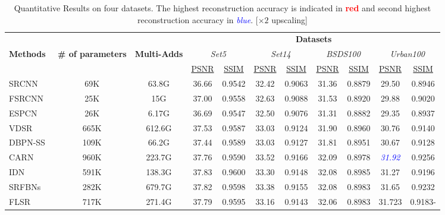 \documentclass[a4paper,11pt]{article}
\begin{document}
\begin{table}[!ht]
\caption{Quantitative Results on four datasets. The highest reconstruction accuracy is indicated in \textbf{\textcolor{red}{red}} and second highest reconstruction accuracy in \textit{\textcolor{blue}{blue}}. [$\times2$ upscaling]
	}
\begin{adjustbox}{width=\columnwidth,center}
		\begin{tabular}{l c c c|c||c|c||c|c||c|c}
\toprule
& &
&\multicolumn{8}{c}{\textbf{Datasets}}\\

			\cmidrule(l){4-11}
\multirow{2}{*}{\textbf{Methods}} & \multirow{2}{*}{\textbf{\# of parameters}} &\multirow{2}{*}{\textbf{Multi-Adds}} &
			\multicolumn{2}{c}{\textit{Set5}}
			&\multicolumn{2}{c}{\textit{Set14}}
			&\multicolumn{2}{c}{\textit{BSDS100}}
			&\multicolumn{2}{c}{\textit{Urban100}}
			\\
			\cmidrule(l){4-5}
			\cmidrule(l){6-7}
			\cmidrule(l){8-9}
			\cmidrule(l){10-11}
&
			&
			& \multicolumn{1}{c|}{\underline{PSNR}} & \multicolumn{1}{c||}{\underline{SSIM}} & \multicolumn{1}{c|}{\underline{PSNR}} & \multicolumn{1}{c||}{\underline{SSIM}}  &
			\multicolumn{1}{c|}{\underline{PSNR}} & \multicolumn{1}{c||}{\underline{SSIM}}  &\multicolumn{1}{c|}{\underline{PSNR}} & \multicolumn{1}{c}{\underline{SSIM}} \\	
SRCNN~\cite{SRCNN} & 69K & 63.8G & 36.66  & 0.9542 &  32.42 &  0.9063 &  31.36 &  0.8879 &  29.50 &  0.8946 \\
			FSRCNN~\cite{FSRCNN} & 25K & 15G &  37.00  & 0.9558 & 32.63 &  0.9088 &  31.53 &  0.8920 & 29.88 &  0.9020 \\	
			ESPCN~\cite{ESPCN} & 26K & 6.17G &  36.69  & 0.9547 & 32.50 &  0.9076 &  31.31 &  0.8882 & 29.35 &  0.8937 \\
			VDSR~\cite{VDSR} & 665K & 612.6G & 37.53  & 0.9587 & 33.03 &  0.9124 &  31.90 &  0.8960 & 30.76 &  0.9140 \\
			DBPN-SS~\cite{DBPN} & 109K & 66.2G & 37.44  & 0.9589 & 33.03 &  0.9127 &  31.81 &  0.8951 & 30.67 &  0.9128 \\
			CARN~\cite{CARN} & 960K & 223.7G &  37.76  & 0.9590 & 33.52 &  0.9166 &  32.09 &  0.8978 & \textit{\textcolor{blue}{31.92}} &  0.9256 \\	
			IDN~\cite{IDN} & 591K & 138.3G &  37.83  & 0.9600 & 33.30 &  0.9148 & 32.08 &  0.8985 &  31.27 &  0.9196 \\
			SRFBNs~\cite{SRFBN} & 282K & 679.7G &  37.82  & 0.9598 &  33.38 &  0.9155 &  32.08 &  0.8983 &  31.65 &  0.9232\\	
			FLSR~\cite{FLSR} & 717K & 271.4G & 37.79  & 0.9595  &  33.16 &  0.9143 & 32.06 &  0.8983 &  31.723 &  0.9183-\\



\end{tabular}
\end{adjustbox}
\end{table}
\end{document}
